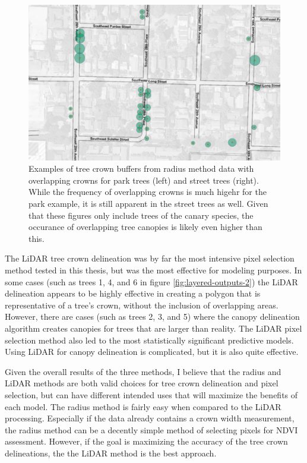 \documentclass[12pt,twoside]{reedthesis}
\begin{document}
\begin{figure}

{\centering \includegraphics[width=0.5\linewidth]{figure/overlapping_street} 

}

\caption[Examples of overlapping park and street tree crowns.]{Examples of tree crown buffers from radius method data with overlapping crowns for park trees (left) and street trees (right). While the frequency of overlapping crowns is much higehr for the park example, it is still apparent in the street trees as well. Given that these figures only include trees of the canary species, the occurance of overlapping tree canopies is likely even higher than this.}\label{fig:overlap-crowns-2}
\end{figure}
The LiDAR tree crown delineation was by far the most intensive pixel
selection method tested in this thesis, but was the most effective for
modeling purposes. In some cases (such as trees 1, 4, and 6 in figure
\ref{fig:layered-outputs-2}) the LiDAR delineation appears to be highly
effective in creating a polygon that is representative of a tree's
crown, without the inclusion of overlapping areas. However, there are
cases (such as trees 2, 3, and 5) where the canopy delineation algorithm
creates canopies for trees that are larger than reality. The LiDAR pixel
selection method also led to the most statistically significant
predictive models. Using LiDAR for canopy delineation is complicated,
but it is also quite effective.

Given the overall results of the three methods, I believe that the
radius and LiDAR methods are both valid choices for tree crown
delineation and pixel selection, but can have different intended uses
that will maximize the benefits of each model. The radius method is
fairly easy when compared to the LiDAR processing. Especially if the
data already contains a crown width measurement, the radius method can
be a decently simple method of selecting pixels for NDVI assessment.
However, if the goal is maximizing the accuracy of the tree crown
delineations, the the LiDAR method is the best approach.
\end{document}
